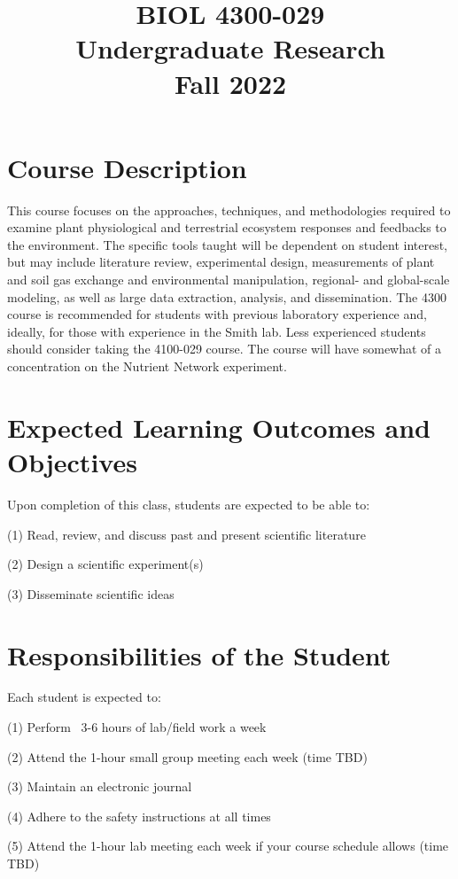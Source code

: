 \documentclass[12pt, notitlepage]{article}   	%
\title{
	\textbf{
		BIOL 4300-029
	} \\
	\large Undergraduate Research \\
	\large Fall 2022
}
\date{\vspace{-5ex}}
\begin{document}
{\selectfont %

\maketitle

\section{Course Description}
This course focuses on the approaches, techniques, and methodologies required to 
examine plant physiological and terrestrial ecosystem responses and feedbacks to 
the environment. The specific tools taught will be dependent on student interest, 
but may include literature review, experimental design, measurements of plant and 
soil gas exchange and environmental manipulation, regional- and global-scale modeling, 
as well as large data extraction, analysis, and dissemination. The 4300 course is 
recommended for students with previous laboratory experience and, ideally, 
for those with experience in the Smith lab. Less experienced students should 
consider taking the 4100-029 course. The course will have somewhat of a concentration on
the Nutrient Network experiment.

\section{Expected Learning Outcomes and Objectives}
Upon completion of this class, students are expected to be able to:\par
(1)	Read, review, and discuss past and present scientific literature\par
(2) Design a scientific experiment(s)\par
(3) Disseminate scientific ideas\par

\section{Responsibilities of the Student}
Each student is expected to:\par
(1) Perform ~3-6 hours of lab/field work a week\par
(2) Attend the 1-hour small group meeting each week (time TBD)\par
(3) Maintain an electronic journal\par
(4) Adhere to the safety instructions at all times\par
(5) Attend the 1-hour lab meeting each week if your course schedule allows (time TBD)\par

}
\end{document}
